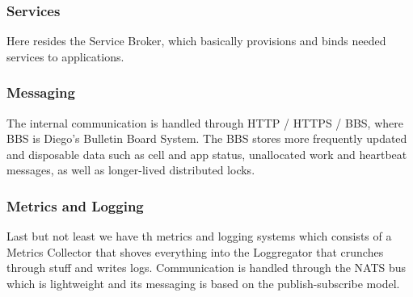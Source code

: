 \subsubsection{Services}
Here resides the Service Broker, which basically provisions and binds needed services to applications.
\subsubsection{Messaging}
The internal communication is handled through HTTP / HTTPS / BBS, where BBS is Diego's Bulletin Board System. The BBS stores more frequently updated and disposable data such as cell and app status, unallocated work and heartbeat messages, as well as longer-lived distributed locks.
\subsubsection{Metrics and Logging}
Last but not least we have th metrics and logging systems which consists of a Metrics Collector that shoves everything into the Loggregator that crunches through stuff and writes logs. \n
Communication is handled through the NATS bus which is lightweight and its messaging is based on the publish-subscribe model.